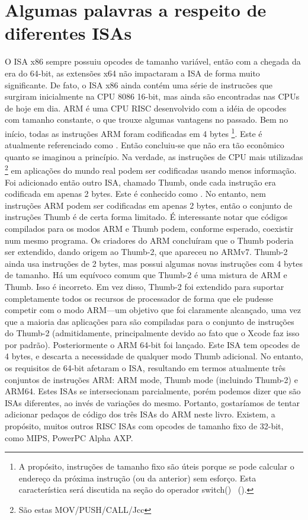 \ifx\LITE\undefined
{}%
%
%

\section{Algumas palavras a respeito de diferentes \ac{ISA}s}
O \ac{ISA} x86 sempre possuiu opcodes de tamanho variável, então com a chegada da era do 64-bit, as extensões x64 não impactaram a \ac{ISA} de forma muito significante. De fato, o \ac{ISA} x86 ainda contém uma série de instrucões que surgiram inicialmente na CPU 8086 16-bit, mas ainda são encontradas nas CPUs de hoje em dia.
ARM é uma \ac{CPU} \ac{RISC} desenvolvido com a idéia de opcodes com tamanho constante, o que trouxe algumas vantagens no passado.
Bem no início, todas as instruções ARM foram codificadas em 4 bytes%
\footnote{A propósito, instruções de tamanho fixo são úteis porque se pode calcular o endereço da próxima instrução (ou da anterior) sem esforço. Esta característica será discutida na seção do operador switch() ~().}.
Este é atualmente referenciado como .
Então concluiu-se que não era tão econômico quanto se imaginou a princípio.
Na verdade, as instruções de \ac{CPU} mais utilizadas \footnote{São estas MOV/PUSH/CALL/Jcc} em aplicações do mundo real podem ser codificadas usando menos informação.
Foi adicionado então outro \ac{ISA}, chamado Thumb, onde cada instrução era codificada em apenas 2 bytes.
Este é conhecido como .
No entanto, nem  instruções ARM podem ser codificadas em apenas 2 bytes, então o conjunto de instruções Thumb é de certa forma limitado.
É interessante notar que códigos compilados para os modos ARM e Thumb podem, conforme esperado, coexistir num mesmo programa.
Os criadores do ARM concluíram que o Thumb poderia ser extendido, dando origem ao Thumb-2, que apareceu no ARMv7.
Thumb-2 ainda usa instruções de 2 bytes, mas possui algumas novas instruções com 4 bytes de tamanho.
Há um equívoco comum que Thumb-2 é uma mistura de ARM e Thumb. Isso é incorreto.
Em vez disso, Thumb-2 foi extendido para suportar completamente todos os recursos de processador de forma que ele pudesse competir com o modo ARM---um objetivo que foi claramente alcançado, uma vez que a maioria das aplicações para \idevices são compiladas para o conjunto de instruções do Thumb-2 (admitidamente, principalmente devido ao fato que o Xcode faz isso por padrão).
Posteriormente o ARM 64-bit foi lançado. Este \ac{ISA} tem opcodes de 4 bytes, e descarta a necessidade de qualquer modo Thumb adicional.
No entanto, os requisitos de 64-bit afetaram o \ac{ISA}, resultando em termos atualmente três conjuntos de instruções ARM: ARM mode, Thumb mode (incluindo Thumb-2) e ARM64.
Estes \ac{ISA}s se intersecionam parcialmente, porém podemos dizer que são \ac{ISA}s diferentes, ao invés de variações do mesmo.
Portanto, gostaríamos de tentar adicionar pedaços de código dos três \ac{ISA}s do ARM neste livro.
%
%
%
Existem, a propósito, muitos outros \ac{RISC} \ac{ISA}s com opcodes de tamanho fixo de 32-bit, como MIPS, PowerPC \PTBRph{} Alpha AXP.
\fi %
\fi %

